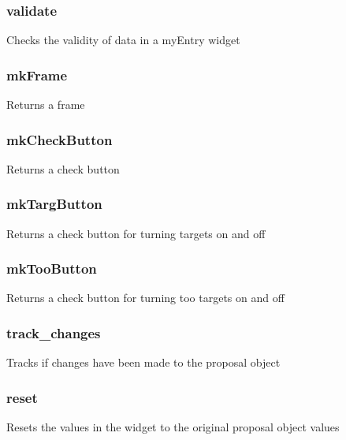 \documentclass{article}
\begin{document}
\subsubsection*{validate\label{EditPage_validate}}


Checks the validity of data in a myEntry widget

\subsubsection*{mkFrame\label{EditPage_mkFrame}}


Returns a frame

\subsubsection*{mkCheckButton\label{EditPage_mkCheckButton}}


Returns a check button

\subsubsection*{mkTargButton\label{EditPage_mkTargButton}}


Returns a check button for turning targets on and off

\subsubsection*{mkTooButton\label{EditPage_mkTooButton}}


Returns a check button for turning too targets on and off

\subsubsection*{track\_changes\label{EditPage_track_changes}}


Tracks if changes have been made to the proposal object

\subsubsection*{reset\label{EditPage_reset}}


Resets the values in the widget to the original proposal object values
\end{document}
